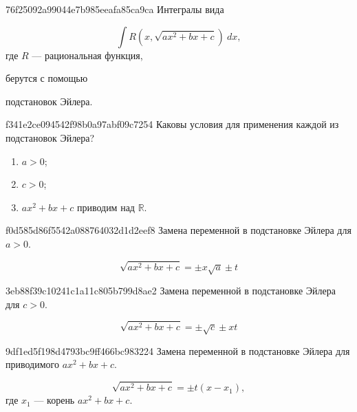 \begin{note}{76f25092a99044e7b985eeafa85ca9ca}
    Интегралы вида \begin{icloze}{2}
    \[
        \int R(x, \sqrt{ax^2 + bx + c})\: dx,
    \]
    где \({ R }\) --- рациональная функция,\end{icloze} берутся с помощью \begin{icloze}{1}подстановок Эйлера.\end{icloze}
\end{note}

\begin{note}{f341e2ce094542f98b0a97abf09c7254}
    Каковы условия для применения каждой из подстановок Эйлера?

    \begin{cloze}{1}
        \begin{enumerate}
            \item \({ a > 0 }\);
            \item \({ c > 0 }\);
            \item \({ ax^2 + bx + c }\) приводим над \({ \mathbb R }\).
        \end{enumerate}
    \end{cloze}
\end{note}

\begin{note}{f0d585d86f5542a088764032d1d2eef8}
    Замена переменной в подстановке Эйлера для \({ a > 0 }\).

    \begin{cloze}{1}
        \[
            \sqrt{ax^2 + bx + c} = \pm x \sqrt{a} \pm t
        \]
    \end{cloze}
\end{note}

\begin{note}{3eb88f39c10241c1a11c805b799d8ae2}
    Замена переменной в подстановке Эйлера для \({ c > 0 }\).

    \begin{cloze}{1}
        \[
            \sqrt{ax^2 + bx + c} = \pm \sqrt{c} \pm xt
        \]
    \end{cloze}
\end{note}

\begin{note}{9df1ed5f198d4793bc9ff466bc983224}
    Замена переменной в подстановке Эйлера для приводимого \({ ax^2 + bx + c }\).

    \begin{cloze}{1}
        \[
            \sqrt{ax^2 + bx + c} = \pm t (x - x_1),
        \]
        где \({ x_1 }\) --- корень \({ ax^2 + bx + c }\).
    \end{cloze}
\end{note}

